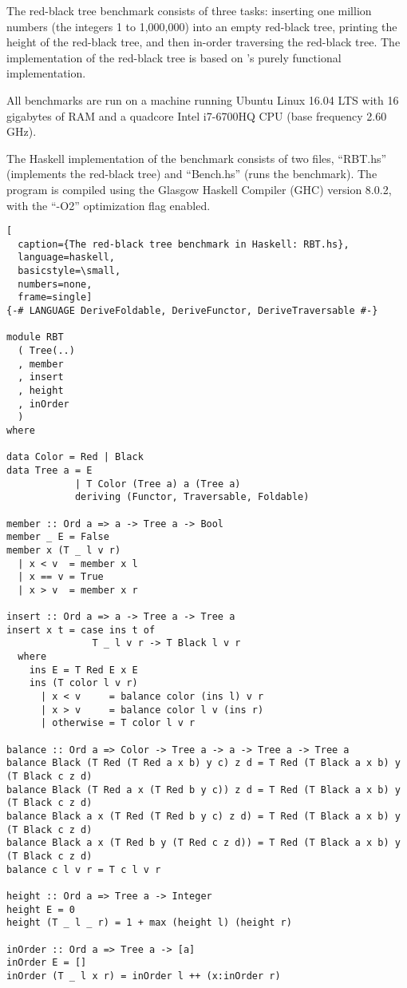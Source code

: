 The red-black tree benchmark consists of three tasks: inserting one million numbers (the integers 1 to 1,000,000) into
an empty red-black tree, printing the height of the red-black tree, and then in-order traversing the red-black tree. The
implementation of the red-black tree is based on \cite{PFDS}'s purely functional implementation.

All benchmarks are run on a machine running Ubuntu Linux 16.04 LTS with 16 gigabytes of RAM and a quadcore Intel i7-6700HQ
CPU (base frequency 2.60 GHz).

The Haskell implementation of the benchmark consists of two files, ``RBT.hs'' (implements the red-black tree) and
``Bench.hs'' (runs the benchmark). The program is compiled using the Glasgow Haskell Compiler (GHC) version
8.0.2, with the ``-O2'' optimization flag enabled.

\begin{lstlisting}[
  caption={The red-black tree benchmark in Haskell: RBT.hs},
  language=haskell,
  basicstyle=\small,
  numbers=none,
  frame=single]
{-# LANGUAGE DeriveFoldable, DeriveFunctor, DeriveTraversable #-}

module RBT
  ( Tree(..)
  , member
  , insert
  , height
  , inOrder
  )
where

data Color = Red | Black
data Tree a = E
            | T Color (Tree a) a (Tree a)
            deriving (Functor, Traversable, Foldable)

member :: Ord a => a -> Tree a -> Bool
member _ E = False
member x (T _ l v r)
  | x < v  = member x l
  | x == v = True
  | x > v  = member x r

insert :: Ord a => a -> Tree a -> Tree a
insert x t = case ins t of
               T _ l v r -> T Black l v r
  where
    ins E = T Red E x E
    ins (T color l v r)
      | x < v     = balance color (ins l) v r
      | x > v     = balance color l v (ins r)
      | otherwise = T color l v r

balance :: Ord a => Color -> Tree a -> a -> Tree a -> Tree a
balance Black (T Red (T Red a x b) y c) z d = T Red (T Black a x b) y (T Black c z d)
balance Black (T Red a x (T Red b y c)) z d = T Red (T Black a x b) y (T Black c z d)
balance Black a x (T Red (T Red b y c) z d) = T Red (T Black a x b) y (T Black c z d)
balance Black a x (T Red b y (T Red c z d)) = T Red (T Black a x b) y (T Black c z d)
balance c l v r = T c l v r

height :: Ord a => Tree a -> Integer
height E = 0
height (T _ l _ r) = 1 + max (height l) (height r)

inOrder :: Ord a => Tree a -> [a]
inOrder E = []
inOrder (T _ l x r) = inOrder l ++ (x:inOrder r)
\end{lstlisting}

